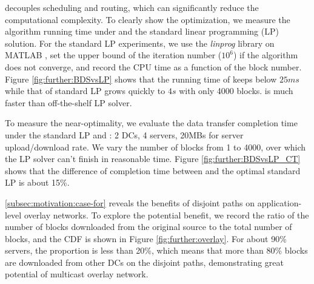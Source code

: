 \label{subsubsec:evaluation:depth}

 \name decouples scheduling and routing, which can significantly reduce the computational complexity. To clearly show the optimization, we measure the algorithm running time under \name and the standard linear programming (LP) solution. For the standard LP experiments, we use the \textit{linprog} library on MATLAB \cite{mathworks}, set the upper bound of the iteration number ($10^6$) if the algorithm does not converge, and record the CPU time as a function of the block number. Figure \ref{fig:further:BDSvsLP} shows that the running time of \name keeps below $25ms$ while that of standard LP grows quickly to $4s$ with only 4000 blocks. %
\name is much faster than off-the-shelf LP solver.

 To measure the near-optimality, we evaluate the data transfer completion time under the standard LP and \name: 2 DCs, 4 servers, 20MBs for server upload/download rate.
We vary the number of blocks from 1 to 4000, over which the LP solver can't finish in reasonable time. Figure \ref{fig:further:BDSvsLP_CT} shows that the difference of completion time between \name and the optimal standard LP is about 15\%.


 \Section\ref{subsec:motivation:case-for} reveals the benefits of disjoint paths on application-level overlay networks. To explore the potential benefit, we record the ratio of the number of blocks downloaded from the original source to the total number of blocks, and the CDF is shown in Figure \ref{fig:further:overlay}. For about 90\% servers, the proportion is less than 20\%, which means that more than 80\% blocks are downloaded from other DCs on the disjoint paths, demonstrating great potential of multicast overlay network.




